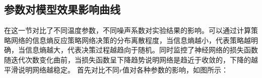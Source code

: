 \subsection{参数对模型效果影响曲线}
在这一节对比了不同温度参数，不同噪声系数对实验结果的影响。可以通过计算策略网络的信息熵反应策略网络决策的分布离散程度，当信息熵越小，代表策略越明确，当信息熵越大，代表决策过程越趋向于随机。同时监控了神经网络的损失函数随迭代次数变化曲前，当损失函数呈下降趋势说明网络是趋近于收敛的，下降的越平滑说明网络越稳定。
首先对比不同$r$值对各种参数的影响，如图所示：
% 	
%



